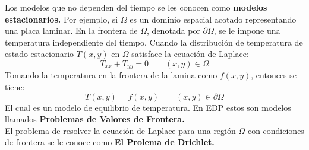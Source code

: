 Los modelos que no dependen del tiempo se les conocen como \textbf{modelos estacionarios.} Por ejemplo, si $\Omega$ es un dominio espacial acotado representando una placa laminar. En la frontera de $\Omega$, denotada por $\partial \Omega$, se le impone una temperatura independiente del tiempo. Cuando la distribución de temperatura de estado estacionario $T(x,y)$ en $\Omega$ satisface la ecuación de Laplace:
	$$T_{xx} + T_{yy} = 0 \quad \quad (x,y)\in \Omega$$
Tomando la temperatura en la frontera de la lamina como $f(x,y)$, entonces se tiene:
	$$T(x,y) = f(x,y) \quad \quad (x,y) \in \partial \Omega$$
El cual es un modelo de equilibrio de temperatura. En EDP estos son modelos llamados \textbf{Problemas de Valores de Frontera.} \\

El problema de resolver la ecuación de Laplace para una región $\Omega$ con condiciones de frontera se le conoce como \textbf{El Prolema de Drichlet.}


\label{CLASE2}
























